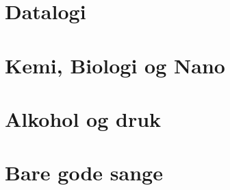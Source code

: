\documentclass[12pt]{book}
\begin{document}
\onecolumn
\chapter*{Datalogi}
\twocolumn








\onecolumn
\chapter*{Kemi, Biologi og Nano}
\twocolumn







\onecolumn
\chapter*{Alkohol og druk}
\twocolumn



\onecolumn
\chapter*{Bare gode sange}
\twocolumn









% 
\end{document}
